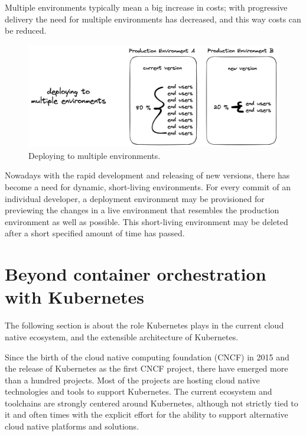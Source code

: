 Multiple environments typically mean a big increase in costs;
with progressive delivery the need for multiple environments has decreased,
and this way costs can be reduced.

\begin{figure}[h]
	\centering
	\includegraphics[width=1.00\linewidth]{assets/deploy-multiple-envs.png}
	\caption{Deploying to multiple environments.
	}
	\label{fig:deploy-multiple-envs}	
\end{figure}

Nowadays with the rapid development and releasing of new versions,
there has become a need for dynamic, short-living environments.
For every commit of an individual developer,
a deployment environment may be provisioned for previewing the changes
in a live environment that resembles the production environment as well as possible.
This short-living environment may be deleted after a short specified amount of time
has passed.






\section{Beyond container orchestration with Kubernetes}
\label{theoretical-background:kubernetes}

The following section is about
the role Kubernetes plays in the current cloud native ecosystem,
and the extensible architecture of Kubernetes.

Since the birth of the cloud native computing foundation (CNCF) in 2015 and the release of Kubernetes as the first CNCF project,
there have emerged more than a hundred projects.
Most of the projects are hosting cloud native technologies and tools to support Kubernetes.
The current ecosystem and toolchains are strongly centered around Kubernetes,
although not strictly tied to it and often times with the explicit effort
for the ability to support alternative cloud native platforms and solutions.

